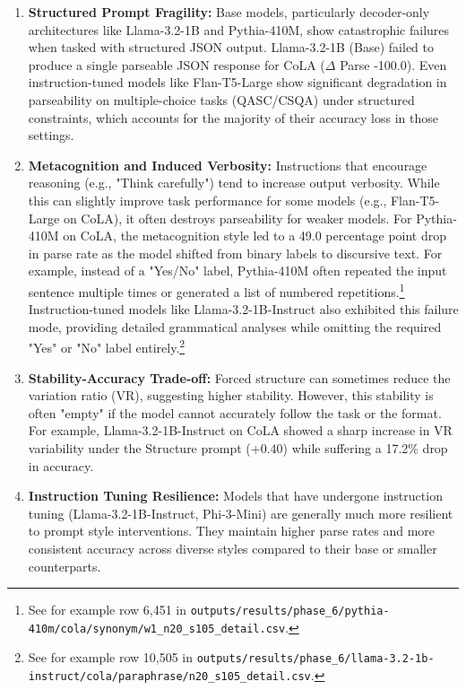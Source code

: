 \documentclass[11pt]{article}
\begin{document}
\begin{enumerate}
    \item \textbf{Structured Prompt Fragility:} Base models, particularly decoder-only architectures like Llama-3.2-1B and Pythia-410M, show catastrophic failures when tasked with structured JSON output. Llama-3.2-1B (Base) failed to produce a single parseable JSON response for CoLA ($\Delta$ Parse -100.0). Even instruction-tuned models like Flan-T5-Large show significant degradation in parseability on multiple-choice tasks (QASC/CSQA) under structured constraints, which accounts for the majority of their accuracy loss in those settings.
    \item \textbf{Metacognition and Induced Verbosity:} Instructions that encourage reasoning (e.g., "Think carefully") tend to increase output verbosity. While this can slightly improve task performance for some models (e.g., Flan-T5-Large on CoLA), it often destroys parseability for weaker models. For Pythia-410M on CoLA, the metacognition style led to a 49.0 percentage point drop in parse rate as the model shifted from binary labels to discursive text. For example, instead of a "Yes/No" label, Pythia-410M often repeated the input sentence multiple times or generated a list of numbered repetitions.\footnote{See for example row 6,451 in \texttt{outputs/results/phase\_6/pythia-410m/cola/synonym/w1\_n20\_s105\_detail.csv}.} Instruction-tuned models like Llama-3.2-1B-Instruct also exhibited this failure mode, providing detailed grammatical analyses while omitting the required "Yes" or "No" label entirely.\footnote{See for example row 10,505 in \texttt{outputs/results/phase\_6/llama-3.2-1b-instruct/cola/paraphrase/n20\_s105\_detail.csv}.} 
    \item \textbf{Stability-Accuracy Trade-off:} Forced structure can sometimes reduce the variation ratio (VR), suggesting higher stability. However, this stability is often "empty" if the model cannot accurately follow the task or the format. For example, Llama-3.2-1B-Instruct on CoLA showed a sharp increase in VR variability under the Structure prompt (+0.40) while suffering a 17.2\% drop in accuracy.
    \item \textbf{Instruction Tuning Resilience:} Models that have undergone instruction tuning (Llama-3.2-1B-Instruct, Phi-3-Mini) are generally much more resilient to prompt style interventions. They maintain higher parse rates and more consistent accuracy across diverse styles compared to their base or smaller counterparts.
\end{enumerate}
\end{document}
